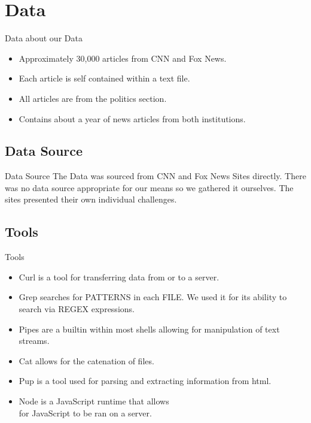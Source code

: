 \documentclass{beamer}
\begin{document}
\section{Data}
\begin{frame}{Data about our Data}
	\begin{itemize}
		\item<1-> Approximately 30,000 articles from CNN and Fox News. \pause
		\item<2-> Each article is self contained within a text file. \pause
		\item<3-> All articles are from the politics section. \pause
		\item<4-> Contains about a year of news articles from both institutions.
	\end{itemize}


\end{frame}
\subsection{Data Source}
\begin{frame}{Data Source}
	The Data was sourced from CNN and Fox News Sites directly.
	There was no data source appropriate for our means so we gathered it ourselves.
	The sites presented their own individual challenges.
\end{frame}
\subsection{Tools}
\begin{frame}{Tools}
	\begin{itemize}
		\item<1->Curl is a tool for transferring data from or to a server.
		\item<2->Grep searches  for  PATTERNS  in  each  FILE. We used it for its ability to search via REGEX expressions.
		\item<3->Pipes are a builtin within most shells allowing for manipulation of text streams.
		\item<4->Cat allows for the catenation of files.
		\item<5->Pup is a tool used for parsing and extracting information from html.
		\item<6->Node is a JavaScript runtime that allows \\for JavaScript to be ran on a server.
	\end{itemize}
\end{frame}
\end{document}
